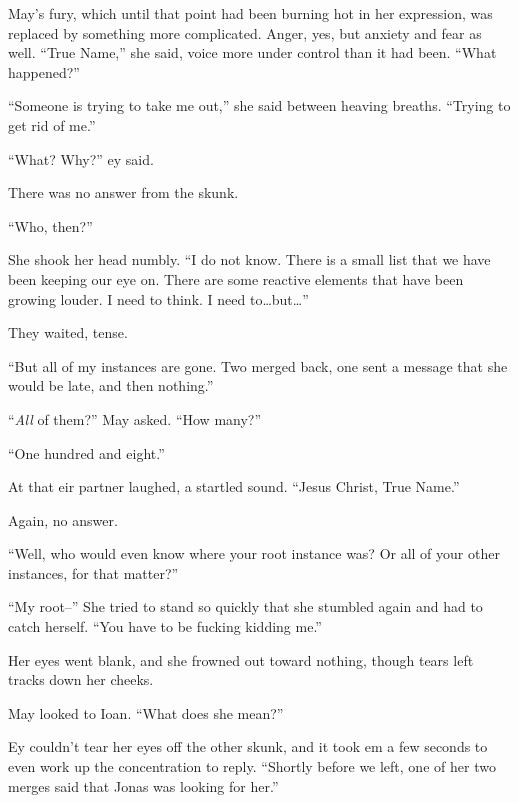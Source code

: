 May's fury, which until that point had been burning hot in her expression, was replaced by something more complicated. Anger, yes, but anxiety and fear as well. ``True Name,'' she said, voice more under control than it had been. ``What happened?''

``Someone is trying to take me out,'' she said between heaving breaths. ``Trying to get rid of me.''

``What? Why?'' ey said.

There was no answer from the skunk.

``Who, then?''

She shook her head numbly. ``I do not know. There is a small list that we have been keeping our eye on. There are some reactive elements that have been growing louder. I need to think. I need to\ldots but\ldots{}''

They waited, tense.

``But all of my instances are gone. Two merged back, one sent a message that she would be late, and then nothing.''

``\emph{All} of them?'' May asked. ``How many?''

``One hundred and eight.''

At that eir partner laughed, a startled sound. ``Jesus Christ, True Name.''

Again, no answer.

``Well, who would even know where your root instance was? Or all of your other instances, for that matter?''

``My root--'' She tried to stand so quickly that she stumbled again and had to catch herself. ``You have to be fucking kidding me.''

Her eyes went blank, and she frowned out toward nothing, though tears left tracks down her cheeks.

May looked to Ioan. ``What does she mean?''

Ey couldn't tear her eyes off the other skunk, and it took em a few seconds to even work up the concentration to reply. ``Shortly before we left, one of her two merges said that Jonas was looking for her.''
